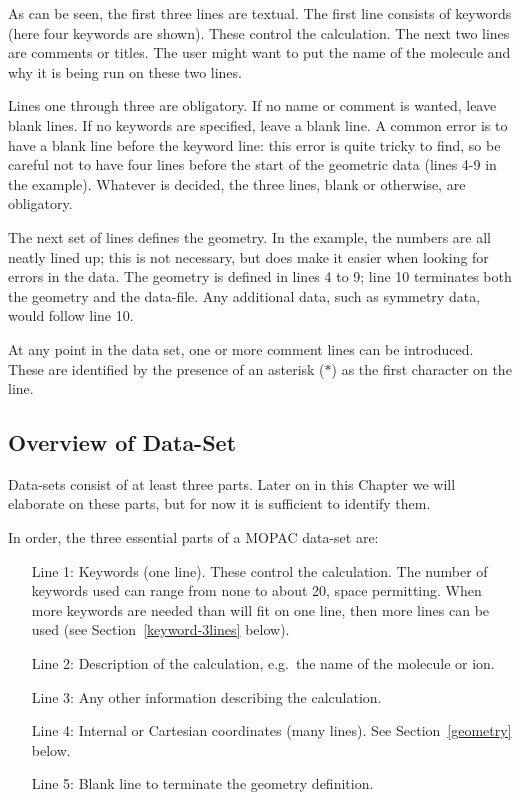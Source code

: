 As can be seen, the first three lines are textual.  The  first  line consists 
of keywords (here four keywords are shown).  These control the calculation. 
The next two lines are comments or titles.  The user  might want to put the
name of the molecule and why it is being run on these two lines.

Lines one through three are obligatory.  If no name or comment is  wanted,
leave  blank lines.  If no keywords are specified, leave a blank line.  A
common error is to have a blank line before the keyword line:  this error is 
quite tricky to find, so be careful not to have four lines before the start of
the geometric data (lines 4-9 in the  example).   Whatever  is decided, the
three lines, blank or otherwise, are obligatory.

The next set of lines defines the geometry.   In  the  example, the numbers are
all neatly lined up; this is not necessary, but does make it easier when
looking for errors in the data.  The geometry is defined  in  lines 4 to 9;
line 10 terminates both the geometry and the data-file.  Any additional  data, 
such as  symmetry  data, would follow line 10.

At any point in the data set, one or more comment lines can be introduced.
These are identified by the presence of an asterisk ($*$) as the first
character on the line.

\subsection{Overview of Data-Set}

 Data-sets consist of at least three parts.  Later on in this Chapter we
will elaborate on these parts, but for now it is sufficient to identify them.

In order, the three essential parts of a MOPAC data-set are:

\begin{enumerate}
\item[Line 1:]  Keywords (one line). These control the calculation. 
The number of keywords used can range from none to about 20, space permitting.  When more keywords are needed than will
fit on one line, then more lines can be used (see Section~\ref{keyword-3lines} below).
\item[Line 2:] Description of the calculation, e.g.\ the name of the molecule
or ion.
\item[Line 3:] Any other information describing the calculation.
\item[Line 4:] Internal or Cartesian coordinates (many lines). See
Section~\ref{geometry} below.
\item[Line 5:]  Blank line to terminate the geometry definition.
\end{enumerate}


%




